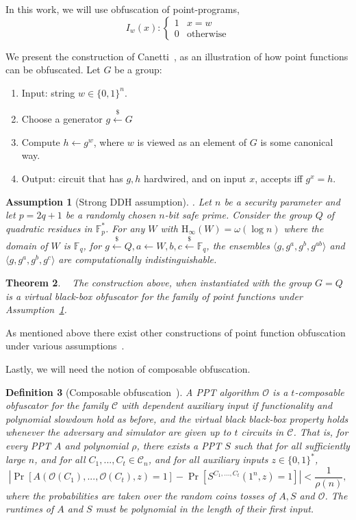 \documentclass[11pt]{article}
\newcommand{\assref}[1]{\mbox{Assumption~\ref{#1}}}
\newcommand{\zo}{\ensuremath{\{0, 1\}}}
\newcommand{\Hoo}{\mathrm{H}_\infty}
\newtheorem{theorem}{Theorem}[section]
\newtheorem{definition}[theorem]{Definition}
\newtheorem{assumption}[theorem]{Assumption}
\begin{document}
In this work, we will use obfuscation of point-programs, 
\[
I_w(x):\begin{cases} 1 & x=w\\0 & \text{otherwise}\end{cases}
\]

We present the construction of Canetti~\cite{canetti1997towards}, as an illustration of how point functions can be obfuscated.  Let $G$ be a group:
\begin{enumerate}  
\item Input: string $w\in \zo^n$.
\item Choose a generator $g\overset{\$}\leftarrow G$
\item Compute $h\leftarrow g^w$, where $w$ is viewed as an element of $G$ is some canonical way.
\item Output: circuit that has $g, h$ hardwired, and on input $x$, accepts iff $g^x=h$.
\end{enumerate}
\begin{assumption}[Strong DDH assumption]\label{ass:strong ddh}.  Let $n$ be a security parameter and let $p = 2q+1$ be a randomly chosen $n$-bit safe prime.  Consider the group $Q$ of quadratic residues in $\mathbb{F}_p^*$.  For any $W$ with $\Hoo(W)= \omega(\log n)$ where the domain of $W$ is $\mathbb{F}_q$, for $g\overset{\$}\leftarrow Q, a\leftarrow W, b,c \overset{\$}\leftarrow \mathbb{F}_q$, the ensembles $\langle g, g^a, g^b, g^{ab}\rangle$ and $\langle g, g^a, g^b, g^c\rangle$ are computationally indistinguishable.
\end{assumption}
\begin{theorem}~\cite{canetti1997towards}
The construction above, when instantiated with the group $G = Q$ is a virtual black-box obfuscator for the family of point functions under \assref{ass:strong ddh}.
\end{theorem}

As mentioned above there exist other constructions of point function obfuscation under various assumptions~\cite{lynn2004positive, wee2005obfuscating}.

Lastly, we will need the notion of composable obfuscation.

\begin{definition}[Composable obfuscation~\cite{bitansky2010strong, canetti2008obfuscating,lynn2004positive}]
\label{def:obf comp}
A PPT algorithm $\mathcal{O}$ is a $t$-\emph{composable obfuscator} for the family $\mathcal{C}$ with dependent auxiliary input if functionality and polynomial slowdown hold as before, and the virtual black black-box property holds whenever the adversary and simulator are given up to $t$ circuits in $\mathcal{C}$.  That is, for every PPT $A$ and polynomial $\rho$, there exists a PPT $S$ such that for all sufficiently large $n$, and for all $C_1,..., C_t\in \mathcal{C}_n$, and for all auxiliary inputs $z\in \zo^*$, 
\[
|\Pr[A(\mathcal{O}(C_1), ..., \mathcal{O}(C_t), z) = 1] - \Pr[S^{C_1,..., C_t}(1^n, z) = 1]| < \frac{1}{\rho(n)},
\]
where the probabilities are taken over the random coins tosses of $A, S$ and $\mathcal{O}$.  The runtimes of $A$ and $S$ must be polynomial in the length of their first input.
\end{definition}
\end{document}

